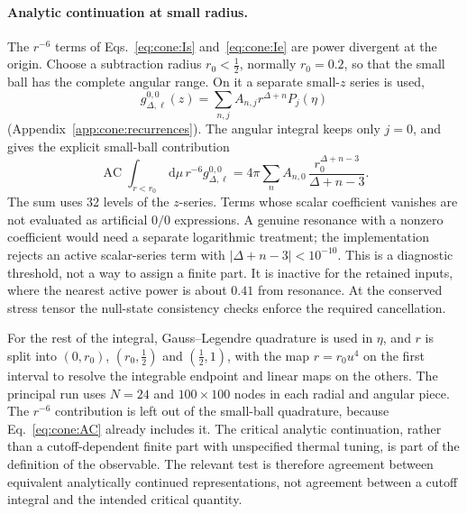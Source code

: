 \documentclass[11pt,a4paper]{article}
\numberwithin{equation}{section}
\newcommand{\dd}{\,\mathrm d}
\newcommand{\AC}{\operatorname{AC}}
\begin{document}
\paragraph{Analytic continuation at small radius.} The $r^{-6}$ terms of Eqs.~\eqref{eq:cone:Is}
and~\eqref{eq:cone:Ie} are power divergent at the origin. Choose a subtraction radius $r_0<\frac12$, normally
$r_0=0.2$, so that the small ball has the complete angular range. On it a separate small-$z$ series is used,
\begin{equation}
 g_{\Delta,\ell}^{0,0}(z)=\sum_{n,j}A_{n,j}r^{\Delta+n}P_j(\eta)
\end{equation}
(Appendix~\ref{app:cone:recurrences}). The angular integral keeps only $j=0$, and gives the explicit small-ball
contribution
\begin{equation}
 \AC\!\int_{r<r_0}\dd\mu\,r^{-6}g_{\Delta,\ell}^{0,0}=4\pi\sum_nA_{n,0}\,\frac{r_0^{\Delta+n-3}}{\Delta+n-3}.
 \label{eq:cone:AC}
\end{equation}
The sum uses 32 levels of the $z$-series. Terms whose scalar coefficient vanishes are not evaluated as artificial
$0/0$ expressions. A genuine resonance with a nonzero coefficient would need a separate logarithmic treatment; the
implementation rejects an active scalar-series term with $|\Delta+n-3|<10^{-10}$. This is a diagnostic threshold, not a
way to assign a finite part. It is inactive for the retained inputs, where the nearest active power is about $0.41$
from resonance. At the conserved stress tensor the null-state consistency checks enforce the required cancellation.

For the rest of the integral, Gauss--Legendre quadrature is used in $\eta$, and $r$ is split into $(0,r_0)$,
$(r_0,\frac12)$ and $(\frac12,1)$, with the map $r=r_0u^4$ on the first interval to resolve the integrable endpoint and
linear maps on the others. The principal run uses $N=24$ and $100\times100$ nodes in each radial and angular piece. The
$r^{-6}$ contribution is left out of the small-ball quadrature, because Eq.~\eqref{eq:cone:AC} already includes it. The
critical analytic continuation, rather than a cutoff-dependent finite part with unspecified thermal tuning, is part of
the definition of the observable. The relevant test is therefore agreement between equivalent analytically continued
representations, not agreement between a cutoff integral and the intended critical quantity.
\end{document}

